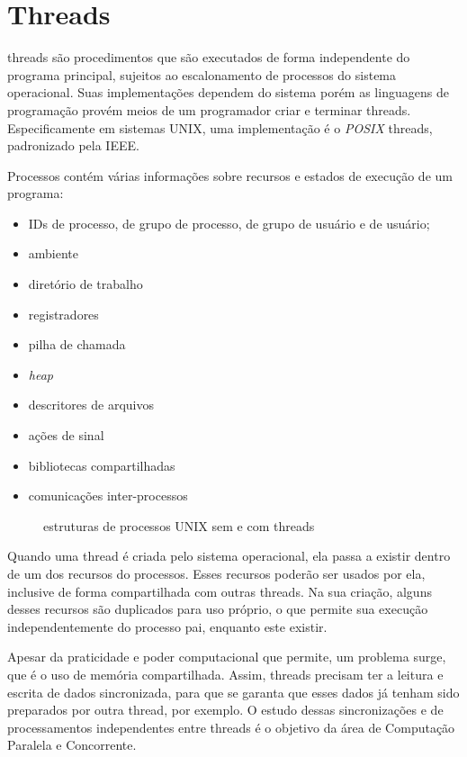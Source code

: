 
\section{Threads}

\Glspl{thread} são procedimentos que são executados de forma independente do programa
principal, sujeitos ao escalonamento de processos do sistema operacional. Suas
implementações dependem do sistema porém as linguagens de programação provém meios de um
programador criar e terminar \glspl*{thread}. Especificamente em sistemas UNIX, uma
implementação é o \emph{POSIX} \Glspl*{thread}, padronizado pela IEEE.

Processos contém várias informações sobre recursos e estados de execução de um programa:

\begin{itemize}
    \item IDs de processo, de grupo de processo, de grupo de usuário e de usuário;
    \item ambiente
    \item diretório de trabalho
    \item registradores
    \item pilha de chamada
    \item \emph{heap}
    \item descritores de arquivos
    \item ações de sinal
    \item bibliotecas compartilhadas
    \item comunicações inter-processos
\end{itemize}

\begin{figure}[H]
    \centering
    \caption{estruturas de processos UNIX sem e com threads}
    \label{fig:threads}
\end{figure}

Quando uma \gls*{thread} é criada pelo sistema operacional, ela passa a existir dentro
de um dos recursos do processos. Esses recursos poderão ser usados por ela, inclusive
de forma compartilhada com outras \glspl*{thread}. Na sua criação, alguns desses
recursos são duplicados para uso próprio, o que permite sua execução independentemente
do processo pai, enquanto este existir.

Apesar da praticidade e poder computacional que permite, um problema surge, que é o uso
de memória compartilhada. Assim, \glspl*{thread} precisam ter a leitura e escrita de
dados sincronizada, para que se garanta que esses dados já tenham sido preparados por
outra \gls*{thread}, por exemplo. O estudo dessas sincronizações e de processamentos
independentes entre \glspl*{thread} é o objetivo da área de Computação Paralela e
Concorrente.

